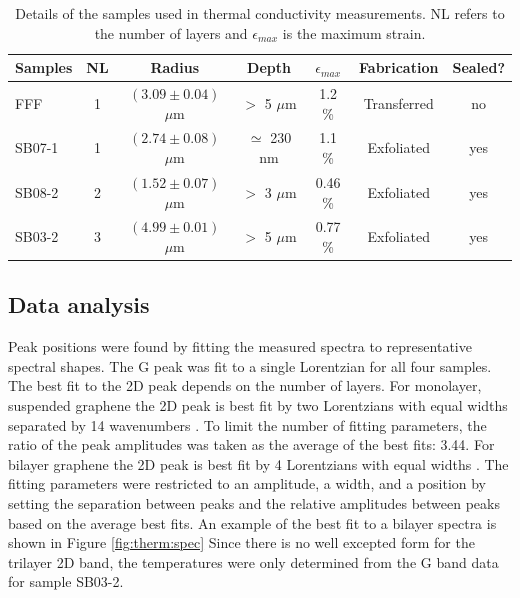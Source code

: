 \begin{table}
	\begin{center}
	\begin{tabular}{l c c c c c c}
		\hline
		\hline
		Samples & NL 	& Radius 					& Depth 		& $\epsilon_{max}$ & Fabrication 		& Sealed? \\
		\hline
		FFF		& 1 	& $(3.09 \pm 0.04)$ $\mu$m 	& $>$ 5 $\mu$m 	& 1.2 \%	& Transferred 	 	& no \\
		SB07-1	& 1 	& $(2.74 \pm 0.08)$ $\mu$m 	& $\simeq$ 230 nm & 1.1 \%	& Exfoliated 		& yes \\
		SB08-2	& 2 	& $(1.52 \pm 0.07)$ $\mu$m 	& $>$ 3 $\mu$m 	& 0.46 \%	& Exfoliated 		& yes \\
		SB03-2	& 3 	& $(4.99 \pm 0.01)$ $\mu$m 	& $>$ 5 $\mu$m 	& 0.77 \%	& Exfoliated 		& yes \\
		\hline
		\hline
	\end{tabular}
	\end{center}
	\caption[Samples used in thermal conductivity measurements]{\label{tab:therm:samples} 
	Details of the samples used in thermal conductivity measurements. NL refers to the number of layers and $\epsilon_{max}$ is the maximum strain.}
\end{table}

\subsection{Data analysis}
Peak positions were found by fitting the measured spectra to representative spectral shapes.
The G peak was fit to a single Lorentzian for all four samples.
The best fit to the 2D peak depends on the number of layers.
For monolayer, suspended graphene the 2D peak is best fit by two Lorentzians with equal widths separated by 14 wavenumbers \cite{Berciaud2013}.
To limit the number of fitting parameters, the ratio of the peak amplitudes was taken as the average of the best fits: 3.44.
For bilayer graphene the 2D peak is best fit by 4 Lorentzians with equal widths \cite{Ferrari2006,Malard2007}.
The fitting parameters were restricted to an amplitude, a width, and a position by setting the separation between peaks and the relative amplitudes between peaks based on the average best fits.
An example of the best fit to a bilayer spectra is shown in Figure \ref{fig:therm:spec}
Since there is no well excepted form for the trilayer 2D band, the temperatures were only determined from the G band data for sample SB03-2.

